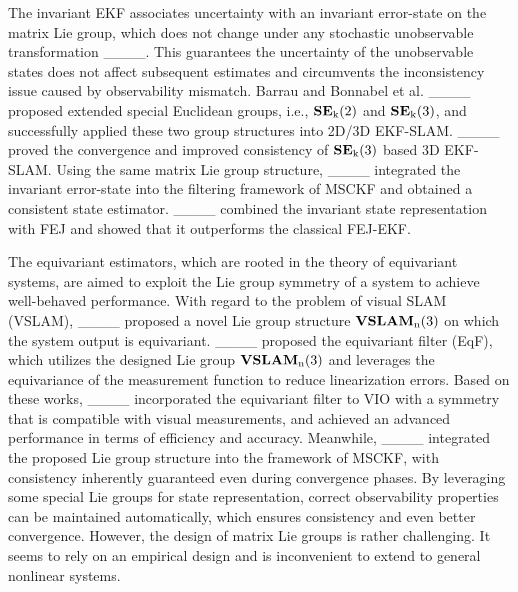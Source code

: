The invariant EKF associates uncertainty with an invariant error-state on the matrix Lie group, which does not change under any stochastic unobservable transformation ____. This guarantees the uncertainty of the unobservable states does not affect subsequent estimates and circumvents the inconsistency issue caused by observability mismatch. Barrau and Bonnabel et al. ____ proposed extended special Euclidean groups, i.e., $\rm \mathbf{SE}_{k}(2)$ and $\rm \mathbf{SE}_{k}(3)$, and successfully applied these two group structures into 2D/3D EKF-SLAM. ____ proved the convergence and improved consistency of $\rm \mathbf{SE}_{k}(3)$ based 3D EKF-SLAM. Using the same matrix Lie group structure, ____ integrated the invariant error-state into the filtering framework of MSCKF and obtained a consistent state estimator. ____ combined the invariant state representation with FEJ and showed that it outperforms the classical FEJ-EKF.

The equivariant estimators, which are rooted in the theory of equivariant systems, are aimed to exploit the Lie group symmetry of a system to achieve well-behaved performance. With regard to the problem of visual SLAM (VSLAM), ____ proposed a novel Lie group structure $\rm \mathbf{VSLAM}_n(3)$ on which the system output is equivariant. ____ proposed the equivariant filter (EqF), which utilizes the designed Lie group $\rm \mathbf{VSLAM}_n(3)$ and leverages the equivariance of the measurement function to reduce linearization errors. Based on these works, ____ incorporated the equivariant filter to VIO with a symmetry that is compatible with visual measurements, and achieved an advanced performance in terms of efficiency and accuracy. Meanwhile, ____ integrated the proposed Lie group structure into the framework of MSCKF, with consistency inherently guaranteed even during convergence phases. By leveraging some special Lie groups for state representation, correct observability properties can be maintained automatically, which ensures consistency and even better convergence. However, the design of matrix Lie groups is rather challenging. It seems to rely on an empirical design and is inconvenient to extend to general nonlinear systems. 


